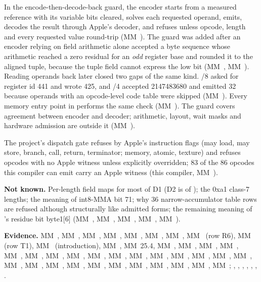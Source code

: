 In the encode-then-decode-back guard, the encoder starts from a measured reference with its variable bits cleared,
solves each requested operand, emits, decodes the result through Apple's decoder, and refuses unless opcode, length and
every requested value round-trip (MM~). The guard was added after an encoder relying on field arithmetic alone accepted a byte sequence whose arithmetic
reached a zero residual for an \emph{odd} register base and rounded it to the aligned tuple, because the tuple
field cannot express the low bit (MM~, MM~). Reading operands back later closed two gaps of the same kind.
/8 asked for register id 441 and wrote 425, and /4 accepted 2147483680 and emitted 32 because
operands with an opcode-level code table were skipped (MM~). Every memory entry point in
 performs the same check (MM~). The guard covers agreement between encoder and decoder;
arithmetic, layout, wait masks and hardware admission are outside it (MM~).

The project's dispatch gate refuses by Apple's instruction flags (may load, may store, branch, call, return,
terminator; memory, atomic, texture) and refuses opcodes with no Apple witness unless explicitly overridden; 83 of the 86
opcodes this compiler can emit carry an Apple witness (this compiler, MM~).

\textbf{Not known.} Per-length field maps for most of D1 (D2 is  of ); the 0xa1 class-7 lengths; the meaning of
int8-MMA bit 71; why 36 narrow-accumulator table rows are refused although structurally like admitted forms; the
remaining meaning of 's residue bit byte1{[}6{]} (MM~, MM~, MM~, MM~, MM~).

\textbf{Evidence.} MM~, MM~, MM~, MM~, MM~, MM~, MM~, MM~ (row R6), MM~ (row T1), MM~ (introduction), MM~, MM~25.4, MM~,
MM~, MM~, MM~, MM~, MM~, MM~, MM~, MM~,
MM~, MM~, MM~, MM~, MM~, MM~, MM~, MM~,
MM~, MM~, MM~, MM~, MM~, MM~, MM~,
MM~, MM~, MM~; , ,
, , , ,
.

